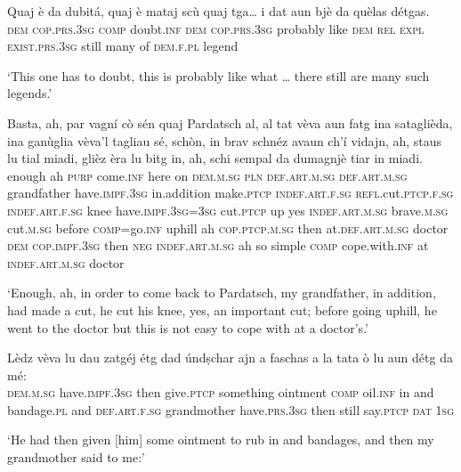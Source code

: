 \begin{linenumbers}
\gll  Quaj è da dubitá, quaj è mataj scù quaj tga… i dat aun bjè da quèlas détgas.  \\
 \textsc{dem}  \textsc{cop.prs.3sg} \textsc{comp} doubt.\textsc{inf} \textsc{dem} \textsc{cop.prs.3sg} probably like \textsc{dem} \textsc{rel} \textsc{expl} \textsc{exist.prs.3sg} still many of  \textsc{dem.f.pl} legend \\
\end{linenumbers}
\medskip
\glt `This one has to doubt, this is probably like what … there still are many such legends.'
\medskip

\begin{linenumbers}
\gll   Basta, ah, par vagní cò sén quaj Pardatsch al, al tat vèva aun fatg ina sataglièda, ina ganùglia vèva’l tagliau sé, schòn, in brav schnéz avaun ch’í vidajn, ah, staus lu tial miadi, glièz èra lu bitg in, ah, schi sempal da dumagnjè tiar in miadi. \\
enough ah  \textsc{purp} come.\textsc{inf} here on \textsc{dem.m.sg} \textsc{pln} \textsc{def.art.m.sg} \textsc{def.art.m.sg} grandfather have.\textsc{impf.3sg} in.addition make.\textsc{ptcp} \textsc{indef.art.f.sg} \textsc{refl.}cut.\textsc{ptcp.f.sg} \textsc{indef.art.f.sg} knee have.\textsc{impf.3sg=3sg} cut.\textsc{ptcp} up yes \textsc{indef.art.m.sg} brave.\textsc{m.sg} cut.\textsc{m.sg}  before \textsc{comp}=go.\textsc{inf} uphill ah \textsc{cop.ptcp.m.sg} then  at.\textsc{def.art.m.sg} doctor \textsc{dem} \textsc{cop.impf.3sg} then \textsc{neg} \textsc{indef.art.m.sg} ah so simple \textsc{comp} cope.with.\textsc{inf} at \textsc{indef.art.m.sg} doctor    \\
\end{linenumbers}
\medskip
\glt `Enough, ah, in order to come back to Pardatsch, my grandfather, in addition, had made a cut, he cut his knee, yes, an important cut; before going uphill, he went to the doctor but this is not easy to cope with at a doctor’s.'
\medskip

\begin{linenumbers}
\gll  Lèdz vèva lu dau zatgéj étg dad úndṣchar ajn a faschas a la tata ò lu aun détg da mé:  \\
 \textsc{dem.m.sg}   have.\textsc{impf.3sg} then  give.\textsc{ptcp} something ointment \textsc{comp} oil.\textsc{inf} in and bandage.\textsc{pl} and  \textsc{def.art.f.sg} grandmother have.\textsc{prs.3sg} then still  say.\textsc{ptcp}  \textsc{dat}  \textsc{1sg}  \\
\end{linenumbers}
\medskip
\glt `He had then given [him] some ointment to rub in and bandages, and then my grandmother said to me:'
\medskip


